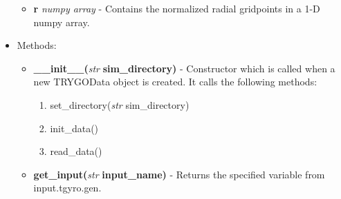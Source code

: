 \documentclass{article}
\begin{document}
\begin{itemize}
\begin{itemize}
\item \textbf{r} \emph{numpy array} - Contains the normalized radial gridpoints in a 1-D numpy array.
\end{itemize}
\item Methods:
\begin{itemize}
\item \textbf{\_\_init\_\_(}\emph{str} \textbf{ sim\_directory)} - Constructor which is called when a new TRYGOData object is created.  It calls the following methods:
\begin{enumerate}
\item set\_directory(\emph{str} sim\_directory)
\item init\_data()
\item read\_data()
\end{enumerate}
\item \textbf{get\_input(}\emph{str}\textbf{ input\_name)} - Returns the specified variable from input.tgyro.gen.


\end{itemize}
\end{itemize}
\end{document}

